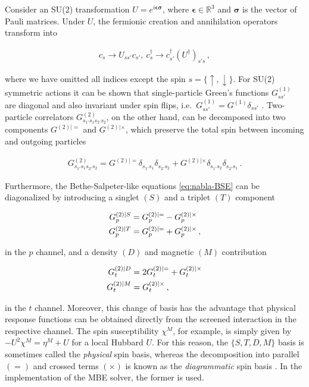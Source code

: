 \documentclass{SciPost}
\begin{document}
\begin{appendix}
Consider an SU(2) transformation $U = e^{i \boldsymbol{\epsilon} \boldsymbol{\sigma}}$, where $\boldsymbol{\epsilon} \in \mathbb{R}^3$ and $\boldsymbol{\sigma}$ is the vector of Pauli matrices. Under $U$, the fermionic creation and annihilation operators transform into
%
\begin{linenomath}
    \begin{align}
        c_{s} \to U_{s s'} c_{s'}, \
        c^{\dagger}_{s} \to c^{\dagger}_{s'} (U^{\dagger})_{s' s} \,,
    \end{align}
\end{linenomath}
%
where we have omitted all indices except the spin $s = \{\uparrow, \downarrow \}$. For SU(2) symmetric actions it can be shown that single-particle Green's functions $G^{(1)}_{s s'}$ are diagonal and also invariant under spin flips, i.e.~$G^{(1)}_{s s'} = G^{(1)} \delta_{s s'}$ \cite{rohringer2013}. Two-particle correlators $G^{(2)}_{s_{1'} s_1 s_{2'} s_{2}}$, on the other hand, can be decomposed into two components $G^{(2) | =}$ and $G^{(2) | \times}$, which preserve the total spin between incoming and outgoing particles
%
\begin{linenomath}
    \begin{align}
        G^{(2)}_{s_{1'} s_1 s_{2'} s_{2}} = G^{(2) | =} \delta_{s_{1'} s_1} \delta_{s_{2'} s_2} + G^{(2) | \times} \delta_{s_{1'} s_2} \delta_{s_{2'} s_1} \,.
    \end{align}
\end{linenomath}
Furthermore, the Bethe-Salpeter-like equations \eqref{eq:nabla-BSE} can be diagonalized by introducing a singlet $(S)$ and a triplet $(T)$ component
%
\begin{linenomath}
    \begin{align}
        G^{(2) | S}_p &= G^{(2) | =}_p - G^{(2) | \times}_p \notag \\
        G^{(2) | T}_p &= G^{(2) | =}_p + G^{(2) | \times}_p \,,
    \end{align}
\end{linenomath}
%
in the $p$ channel, and a density $(D)$ and magnetic $(M)$ contribution
%
\begin{linenomath}
    \begin{align}
        G^{(2) | D}_t &= 2 G^{(2) | =}_t + G^{(2) | \times}_t \notag \\
        G^{(2) | M}_t &= G^{(2) | \times}_t \,,
    \end{align}
\end{linenomath}
%
in the $t$ channel. Moreover, this change of basis has the advantage that physical response functions can be obtained directly from the screened interaction in the respective channel. The spin susceptibility $\chi^M$, for example, is simply given by $-U^2 \chi^M = \eta^M + U$ for a local Hubbard $U$. For this reason, the $\{S, T, D, M\}$ basis is sometimes called the \textsl{physical} spin basis, whereas the decomposition into parallel $(=)$ and crossed terms $(\times)$ is known as the \textsl{diagrammatic} spin basis \cite{rohringer2013}. In the implementation of the MBE solver, the former is used.


\end{appendix}
\end{document}
